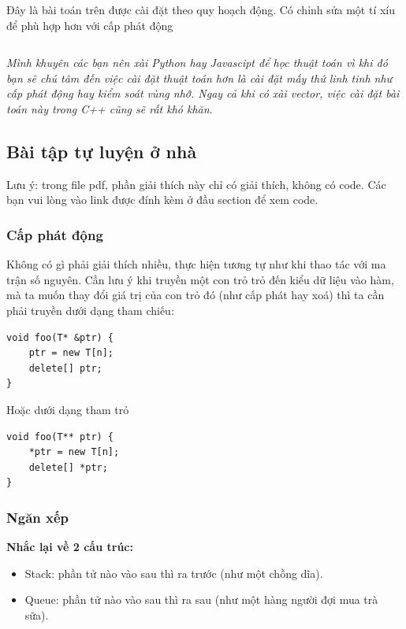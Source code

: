 \documentclass[main.tex]{subfiles}
\begin{document}
Đây là bài toán trên được cài đặt theo quy hoạch động. Có chỉnh sửa một tí xíu để phù hợp hơn với cấp phát động
\inputminted[linenos,breaklines]{cpp}{answer_sources/QuyHoachDong_ToiUu.cpp}

\textit{\footnotesize Mình khuyên các bạn nên xài Python hay Javascipt để học thuật toán vì khi đó bạn sẽ chú tâm đến việc cài đặt thuật toán hơn là cài đặt mấy thứ linh tinh như cấp phát động hay kiểm soát vùng nhớ. Ngay cả khi có xài vector, việc cài đặt bài toán này trong C++ cũng sẽ rất khó khăn}.



\subsection{Bài tập tự luyện ở nhà}
Lưu ý: trong file pdf, phần giải thích này chỉ có giải thích, không có code. Các bạn vui lòng vào link được đính kèm ở đầu section để xem code.
\subsubsection{Cấp phát động}
Không có gì phải giải thích nhiều, thực hiện tương tự như khi thao tác với ma trận số nguyên.
Cần lưu ý khi truyền một con trỏ trỏ đến kiểu dữ liệu  vào hàm, mà ta muốn thay đổi giá trị của con trỏ đó (như cấp phát hay xoá) thì ta cần phải truyền dưới dạng tham chiếu: 
\begin{verbatim}
void foo(T* &ptr) {
    ptr = new T[n];
    delete[] ptr;
}
\end{verbatim}
Hoặc dưới dạng tham trỏ
\begin{verbatim}
void foo(T** ptr) {
    *ptr = new T[n];
    delete[] *ptr;
}
\end{verbatim}

\subsubsection{Ngăn xếp}
\textbf{Nhắc lại về 2 cấu trúc:}
\begin{itemize}
    \item Stack: phần tử nào vào sau thì ra trước (như một chồng dĩa).
    \item Queue: phần tử nào vào sau thì ra sau (như một hàng người đợi mua trà sữa).
\end{itemize}
\end{document}
